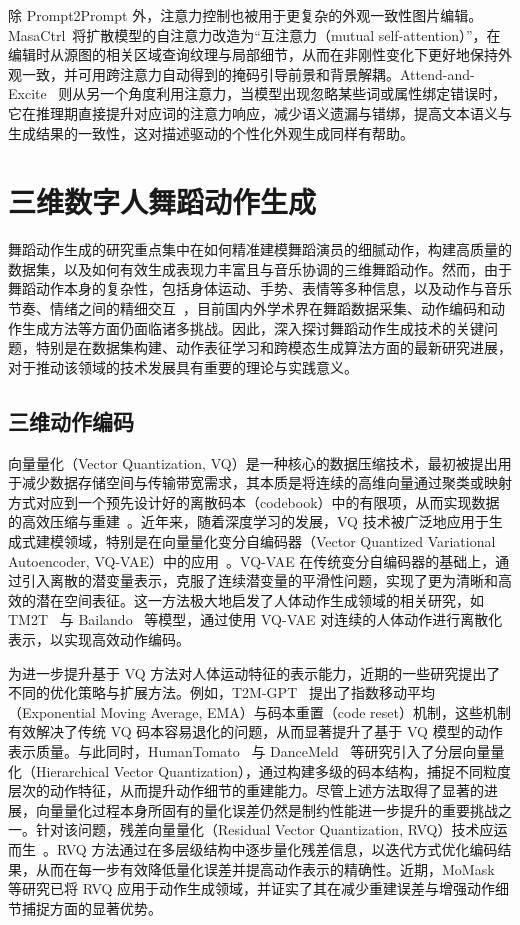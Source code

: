 除 Prompt2Prompt 外，注意力控制也被用于更复杂的外观一致性图片编辑。MasaCtrl~\cite{cao2023masactrl}将扩散模型的自注意力改造为“互注意力（mutual self-attention）”，在编辑时从源图的相关区域查询纹理与局部细节，从而在非刚性变化下更好地保持外观一致，并可用跨注意力自动得到的掩码引导前景和背景解耦。Attend-and-Excite~\cite{chefer2023attend} 则从另一个角度利用注意力，当模型出现忽略某些词或属性绑定错误时，它在推理期直接提升对应词的注意力响应，减少语义遗漏与错绑，提高文本语义与生成结果的一致性，这对描述驱动的个性化外观生成同样有帮助。


\section{三维数字人舞蹈动作生成}
舞蹈动作生成的研究重点集中在如何精准建模舞蹈演员的细腻动作，构建高质量的数据集，以及如何有效生成表现力丰富且与音乐协调的三维舞蹈动作。然而，由于舞蹈动作本身的复杂性，包括身体运动、手势、表情等多种信息，以及动作与音乐节奏、情绪之间的精细交互~\cite{1016154760, MYSY202106014}，目前国内外学术界在舞蹈数据采集、动作编码和动作生成方法等方面仍面临诸多挑战。因此，深入探讨舞蹈动作生成技术的关键问题，特别是在数据集构建、动作表征学习和跨模态生成算法方面的最新研究进展，对于推动该领域的技术发展具有重要的理论与实践意义。

\subsection{三维动作编码}
向量量化（Vector Quantization, VQ）是一种核心的数据压缩技术，最初被提出用于减少数据存储空间与传输带宽需求，其本质是将连续的高维向量通过聚类或映射方式对应到一个预先设计好的离散码本（codebook）中的有限项，从而实现数据的高效压缩与重建~\cite{gray1998quantization}。近年来，随着深度学习的发展，VQ 技术被广泛地应用于生成式建模领域，特别是在向量量化变分自编码器（Vector Quantized Variational Autoencoder, VQ-VAE）中的应用~\cite{van2017neural}。VQ-VAE 在传统变分自编码器的基础上，通过引入离散的潜变量表示，克服了连续潜变量的平滑性问题，实现了更为清晰和高效的潜在空间表征。这一方法极大地启发了人体动作生成领域的相关研究，如 TM2T~\cite{guo2022tm2t} 与 Bailando~\cite{siyao2022bailando} 等模型，通过使用 VQ-VAE 对连续的人体动作进行离散化表示，以实现高效动作编码。

为进一步提升基于 VQ 方法对人体运动特征的表示能力，近期的一些研究提出了不同的优化策略与扩展方法。例如，T2M-GPT~\cite{zhang2023t2m} 提出了指数移动平均（Exponential Moving Average, EMA）与码本重置（code reset）机制，这些机制有效解决了传统 VQ 码本容易退化的问题，从而显著提升了基于 VQ 模型的动作表示质量。与此同时，HumanTomato~\cite{lu2023humantomato} 与 DanceMeld~\cite{gao2023dancemeld} 等研究引入了分层向量量化（Hierarchical Vector Quantization），通过构建多级的码本结构，捕捉不同粒度层次的动作特征，从而提升动作细节的重建能力。尽管上述方法取得了显著的进展，向量量化过程本身所固有的量化误差仍然是制约性能进一步提升的重要挑战之一。针对该问题，残差向量量化（Residual Vector Quantization, RVQ）技术应运而生~\cite{zeghidour2021soundstream, borsos2023audiolm}。RVQ 方法通过在多层级结构中逐步量化残差信息，以迭代方式优化编码结果，从而在每一步有效降低量化误差并提高动作表示的精确性。近期，MoMask~\cite{guo2024momask} 等研究已将 RVQ 应用于动作生成领域，并证实了其在减少重建误差与增强动作细节捕捉方面的显著优势。

